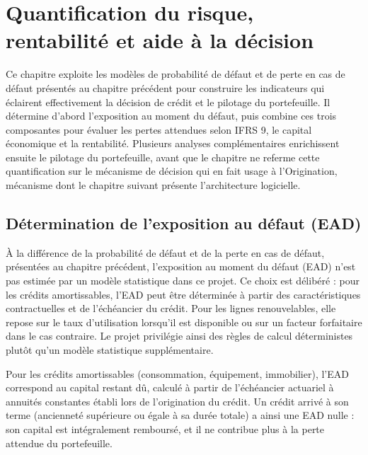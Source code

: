 \chapter{Quantification du risque, rentabilité et aide à la décision}

Ce chapitre exploite les modèles de probabilité de défaut et de perte en cas de défaut présentés au chapitre précédent pour construire les indicateurs qui éclairent effectivement la décision de crédit et le pilotage du portefeuille. Il détermine d'abord l'exposition au moment du défaut, puis combine ces trois composantes pour évaluer les pertes attendues selon IFRS 9, le capital économique et la rentabilité. Plusieurs analyses complémentaires enrichissent ensuite le pilotage du portefeuille, avant que le chapitre ne referme cette quantification sur le mécanisme de décision qui en fait usage à l'Origination, mécanisme dont le chapitre suivant présente l'architecture logicielle.

\section{Détermination de l'exposition au défaut (EAD)}

À la différence de la probabilité de défaut et de la perte en cas de défaut, présentées au chapitre précédent, l'exposition au moment du défaut (EAD) n'est pas estimée par un modèle statistique dans ce projet. Ce choix est délibéré : pour les crédits amortissables, l'EAD peut être déterminée à partir des caractéristiques contractuelles et de l'échéancier du crédit. Pour les lignes renouvelables, elle repose sur le taux d'utilisation lorsqu'il est disponible ou sur un facteur forfaitaire dans le cas contraire. Le projet privilégie ainsi des règles de calcul déterministes plutôt qu'un modèle statistique supplémentaire.

Pour les crédits amortissables (consommation, équipement, immobilier), l'EAD correspond au capital restant dû, calculé à partir de l'échéancier actuariel à annuités constantes établi lors de l'origination du crédit. Un crédit arrivé à son terme (ancienneté supérieure ou égale à sa durée totale) a ainsi une EAD nulle : son capital est intégralement remboursé, et il ne contribue plus à la perte attendue du portefeuille.

